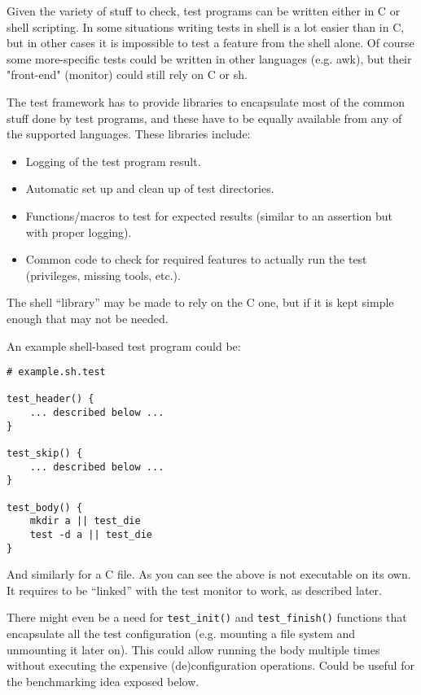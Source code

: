 \documentclass[a4paper,10pt]{article}
\begin{document}
Given the variety of stuff to check, test programs can be written either in
C or shell scripting.  In some situations writing tests in shell is a lot
easier than in C, but in other cases it is impossible to test a feature
from the shell alone.  Of course some more-specific tests could be written
in other languages (e.g. awk), but their "front-end" (monitor) could still
rely on C or sh.

The test framework has to provide libraries to encapsulate most of the
common stuff done by test programs, and these have to be equally available
from any of the supported languages.  These libraries include:

\begin{itemize}

\item Logging of the test program result.

\item Automatic set up and clean up of test directories.

\item Functions/macros to test for expected results (similar to an
assertion but with proper logging).

\item Common code to check for required features to actually run the test
(privileges, missing tools, etc.).

\end{itemize}

The shell ``library'' may be made to rely on the C one, but if it is kept
simple enough that may not be needed.

An example shell-based test program could be:

\begin{verbatim}
# example.sh.test

test_header() {
    ... described below ...
}

test_skip() {
    ... described below ...
}

test_body() {
    mkdir a || test_die
    test -d a || test_die
}
\end{verbatim}

And similarly for a C file.  As you can see the above is not executable on
its own.  It requires to be ``linked'' with the test monitor to work, as
described later.

There might even be a need for \verb*|test_init()| and
\verb*|test_finish()| functions that encapsulate all the test configuration
(e.g. mounting a file system and unmounting it later on).  This could allow
running the body multiple times without executing the expensive
(de)configuration operations.  Could be useful for the benchmarking idea
exposed below.
\end{document}
